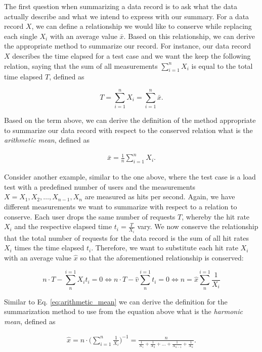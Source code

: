 The first question when summarizing a data
record is to ask what the data actually describe and what we intend to express
with our summary. For a data record $X$, we can define a
relationship we would like to conserve while replacing each single $X_i$ with an
average value $\bar{x}$. Based on this relationship, we can derive the
appropriate method to summarize our record. For instance, our data record $X$
describes the time elapsed for a test case and we want the keep the following
relation, saying that the sum of all measurements $\sum_{i = 1}^{n} X_i$ is
equal to the total time elapsed $T$, defined as

$$
T = \sum_{i = 1}^{n} X_i = \sum_{i = 1}^{n} \bar{x}.
$$

Based on the term above, we can derive the definition of the method
appropriate to summarize our data record with respect to the conserved relation
what is the \emph{arithmetic mean}, defined as

\begin{equation} \label{eq:arithmetic_mean}
\begin{split}
\bar{x} = \frac{1}{n} \sum_{i = 1}^{n} X_i.
\end{split}
\end{equation}

Consider another example, similar to the one above, where the test
case is a load test with a predefined number of users and the measurements $X =
X_1, X_2, \ldots, X_{n-1}, X_n$ are
measured as hits per second. Again, we have different measurements we want to
summarize with respect to a relation to conserve. Each user drops the same
number of requests $T$, whereby the hit rate $X_i$ and the respective elapsed
time $t_i = \frac{T}{X_i }$ vary. We now conserve the relationship that the
total number of requests for the data record is the sum of all hit rates $X_i$
times the time elapsed $t_i$. Therefore, we want to substitute each hit rate
$X_i$ with an average value $\hat{x}$ so that the aforementioned relationship is
conserved:

$$
n\cdot T - \sum_{n}^{i=1} X_it_i = 0 \Leftrightarrow n\cdot T - \hat{v}
\sum_{n}^{i=1} t_i = 0 \Leftrightarrow n = \hat{x} \sum_{n}^{i=1} \frac{1}{X_i}
$$

Similar to Eq. \ref{eq:arithmetic_mean} we can derive the definition for the summarization
method to use from the equation above what is the \emph{harmonic mean}, defined as

\begin{equation} \label{eq:harmonic_mean}
\begin{split}
\hat{x} = n \cdot \bigg(\sum_{i=1}^{n} \frac{1}{X_i}\bigg)^{-1} =
\frac{n}{\frac{1}{X_1} + \frac{1}{X_2} + \ldots +
\frac{1}{X_{n-1}} + \frac{1}{X_n}}.
\end{split}
\end{equation}

